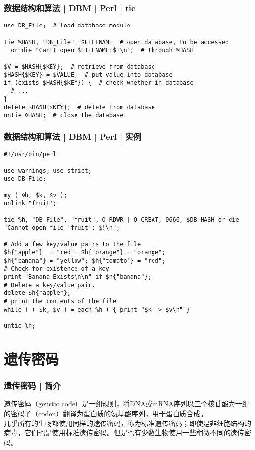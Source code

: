 \begin{frame}[fragile]
  \frametitle{数据结构和算法 | DBM | Perl | tie}
  \vspace{-0.5em}
\begin{lstlisting}
use DB_File;  # load database module

tie %HASH, "DB_File", $FILENAME  # open database, to be accessed
  or die "Can't open $FILENAME:$!\n";  # through %HASH

$V = $HASH{$KEY};  # retrieve from database
$HASH{$KEY} = $VALUE;  # put value into database
if (exists $HASH{$KEY}) {  # check whether in database
  # ...
}
delete $HASH{$KEY};  # delete from database
untie %HASH;  # close the database
\end{lstlisting}
\end{frame}

\begin{frame}[fragile]
  \frametitle{数据结构和算法 | DBM | Perl | 实例}
\begin{lstlisting}[basicstyle=\scriptsize\tt,numberstyle=\scriptsize]
#!/usr/bin/perl

use warnings; use strict;
use DB_File;

my ( %h, $k, $v );
unlink "fruit";

tie %h, "DB_File", "fruit", O_RDWR | O_CREAT, 0666, $DB_HASH or die "Cannot open file 'fruit': $!\n";

# Add a few key/value pairs to the file
$h{"apple"}  = "red"; $h{"orange"} = "orange";
$h{"banana"} = "yellow"; $h{"tomato"} = "red";
# Check for existence of a key
print "Banana Exists\n\n" if $h{"banana"};
# Delete a key/value pair.
delete $h{"apple"};
# print the contents of the file
while ( ( $k, $v ) = each %h ) { print "$k -> $v\n" }

untie %h;
\end{lstlisting}
\end{frame}

\section{遗传密码}
\begin{frame}
  \frametitle{遗传密码 | 简介}
  遗传密码（genetic code）是一组规则，将DNA或mRNA序列以三个核苷酸为一组的密码子（codon）翻译为蛋白质的氨基酸序列，用于蛋白质合成。\\
  \vspace{1em}
  几乎所有的生物都使用同样的遗传密码，称为标准遗传密码；即使是非细胞结构的病毒，它们也是使用标准遗传密码。但是也有少数生物使用一些稍微不同的遗传密码。
\end{frame}

